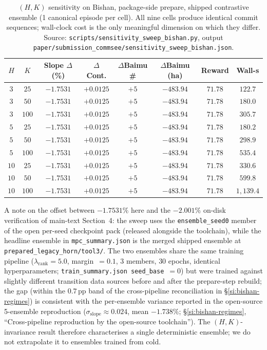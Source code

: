 \documentclass[11pt]{article}
\begin{document}
\begin{table}[htbp]
\centering
\small
\caption{$(H, K)$ sensitivity on Bishan, package-side prepare, shipped contrastive ensemble (1 canonical episode per cell). All nine cells produce identical commit sequences; wall-clock cost is the only meaningful dimension on which they differ. Source: \texttt{scripts/sensitivity\_sweep\_bishan.py}, output \texttt{paper/submission\_commsee/sensitivity\_sweep\_bishan.json}.}
\label{tab:si-hk-sweep}
\begin{tabular}{cccccccc}
\toprule
$H$ & $K$ & Slope $\Delta$ (\%) & $\Delta$Cont. & $\Delta$Baimu \# & $\Delta$Baimu (ha) & Reward & Wall-s \\
\midrule
$3$  & $25$  & $-1.7531$ & $+0.0125$ & $+5$ & $-483.94$ & $71.78$ & $122.7$ \\
$3$  & $50$  & $-1.7531$ & $+0.0125$ & $+5$ & $-483.94$ & $71.78$ & $180.0$ \\
$3$  & $100$ & $-1.7531$ & $+0.0125$ & $+5$ & $-483.94$ & $71.78$ & $305.7$ \\
$5$  & $25$  & $-1.7531$ & $+0.0125$ & $+5$ & $-483.94$ & $71.78$ & $180.2$ \\
$5$  & $50$  & $-1.7531$ & $+0.0125$ & $+5$ & $-483.94$ & $71.78$ & $298.9$ \\
$5$  & $100$ & $-1.7531$ & $+0.0125$ & $+5$ & $-483.94$ & $71.78$ & $535.4$ \\
$10$ & $25$  & $-1.7531$ & $+0.0125$ & $+5$ & $-483.94$ & $71.78$ & $330.6$ \\
$10$ & $50$  & $-1.7531$ & $+0.0125$ & $+5$ & $-483.94$ & $71.78$ & $599.8$ \\
$10$ & $100$ & $-1.7531$ & $+0.0125$ & $+5$ & $-483.94$ & $71.78$ & $1{,}139.4$ \\
\bottomrule
\end{tabular}
\end{table}

A note on the offset between $-1.7531\%$ here and the $-2.001\%$ on-disk verification of main-text Section~4: the sweep uses the \texttt{ensemble\_seed0} member of the open per-seed checkpoint pack (released alongside the toolchain), while the headline ensemble in \texttt{mpc\_summary.json} is the merged shipped ensemble at \texttt{prepared\_legacy\_horn/tool3/}. The two ensembles share the same training pipeline ($\lambda_{\text{rank}}=5.0$, margin~$=0.1$, $3$ members, $30$ epochs, identical hyperparameters; \texttt{train\_summary.json}~\texttt{seed\_base}~$=0$) but were trained against slightly different transition data sources before and after the prepare-step rebuild; the gap (within the $0.7$\,pp band of the cross-pipeline reconciliation in \S\ref{si:bishan-regimes}) is consistent with the per-ensemble variance reported in the open-source 5-ensemble reproduction ($\sigma_{\text{slope}} \approx 0.024$, mean $-1.738\%$; \S\ref{si:bishan-regimes}, ``Cross-pipeline reproduction by the open-source toolchain''). The $(H, K)$-invariance result therefore characterises a single deterministic ensemble; we do not extrapolate it to ensembles trained from cold.
\end{document}
